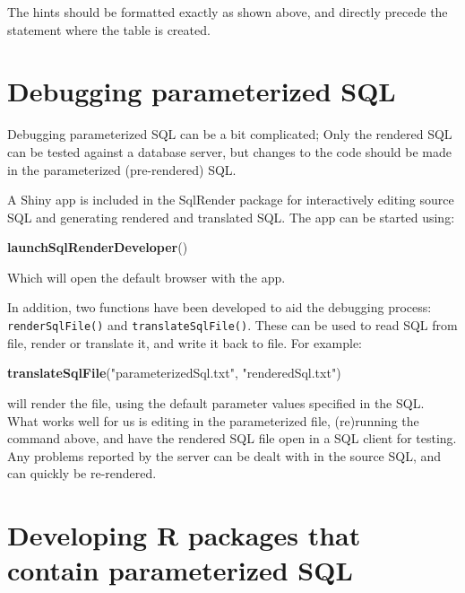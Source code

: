 \documentclass[]{article}
\newenvironment{Shaded}{\begin{snugshade}}{\end{snugshade}}
\newcommand{\KeywordTok}[1]{\textcolor[rgb]{0.13,0.29,0.53}{\textbf{#1}}}
\newcommand{\NormalTok}[1]{#1}
\newcommand{\StringTok}[1]{\textcolor[rgb]{0.31,0.60,0.02}{#1}}
\begin{document}
The hints should be formatted exactly as shown above, and directly
precede the statement where the table is created.

\hypertarget{debugging-parameterized-sql}{%
\section{Debugging parameterized
SQL}\label{debugging-parameterized-sql}}

Debugging parameterized SQL can be a bit complicated; Only the rendered
SQL can be tested against a database server, but changes to the code
should be made in the parameterized (pre-rendered) SQL.

A Shiny app is included in the SqlRender package for interactively
editing source SQL and generating rendered and translated SQL. The app
can be started using:

\begin{Shaded}
\begin{Highlighting}[]
\KeywordTok{launchSqlRenderDeveloper}\NormalTok{()}
\end{Highlighting}
\end{Shaded}

Which will open the default browser with the app.

In addition, two functions have been developed to aid the debugging
process: \texttt{renderSqlFile()} and \texttt{translateSqlFile()}. These
can be used to read SQL from file, render or translate it, and write it
back to file. For example:

\begin{Shaded}
\begin{Highlighting}[]
\KeywordTok{translateSqlFile}\NormalTok{(}\StringTok{"parameterizedSql.txt"}\NormalTok{, }\StringTok{"renderedSql.txt"}\NormalTok{)}
\end{Highlighting}
\end{Shaded}

will render the file, using the default parameter values specified in
the SQL. What works well for us is editing in the parameterized file,
(re)running the command above, and have the rendered SQL file open in a
SQL client for testing. Any problems reported by the server can be dealt
with in the source SQL, and can quickly be re-rendered.

\hypertarget{developing-r-packages-that-contain-parameterized-sql}{%
\section{Developing R packages that contain parameterized
SQL}\label{developing-r-packages-that-contain-parameterized-sql}}
\end{document}
